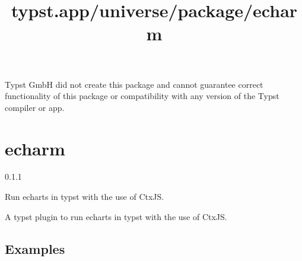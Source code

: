 Typst GmbH did not create this package and cannot guarantee correct
functionality of this package or compatibility with any version of the
Typst compiler or app.


\title{typst.app/universe/package/echarm}

\label{banner}
\section{echarm}\label{echarm}

{ 0.1.1 }

Run echarts in typst with the use of CtxJS.

\label{readme}
A typst plugin to run echarts in typst with the use of CtxJS.

\subsection{Examples}\label{examples}

